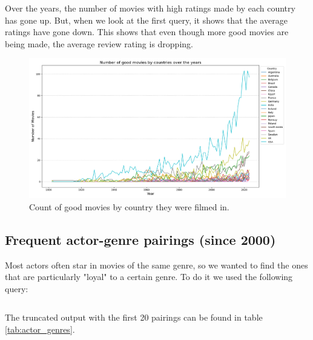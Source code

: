 \documentclass{Configuration_Files/PoliMi3i_thesis}
\begin{document}
Over the years, the number of movies with high ratings made by each country has gone up. But, when we look at the first query, it shows that the average ratings have gone down. This shows that even though more good movies are being made, the average review rating is dropping.


\begin{figure}[H]
  \centering
  \includegraphics[width=\textwidth]{latex/letterboxd/visualization/good_movies_by_country.png}
  \caption{Count of good movies by country they were filmed in.}
  \label{fig:good_movies_by_countries}
\end{figure}

\subsection{Frequent actor-genre pairings (since 2000)}

Most actors often star in movies of the same genre, so we wanted to find the ones that are particularly "loyal" to a certain genre. To do it we used the following query:

\inputminted[frame=single,framesep=10pt,breaklines]{cypher}{letterboxd/queries/query8.cypher}

The truncated output with the first 20 pairings can be found in table \ref{tab:actor_genres}.
\end{document}
